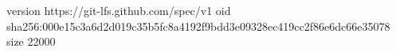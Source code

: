 version https://git-lfs.github.com/spec/v1
oid sha256:000e15c3a6d2d019c35b5fc8a4192f9bdd3e09328ec419cc2f86e6dc66e35078
size 22000
